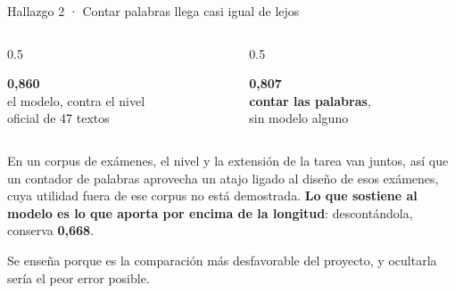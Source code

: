 \documentclass[aspectratio=169,11pt]{beamer}
\newcommand{\cifra}[2]{%
  \begin{minipage}{\linewidth}\centering
    {\fontsize{42}{46}\selectfont\bfseries\color{llazul}#1}\\[4pt]
    {\small\color{llgris}#2}
  \end{minipage}}
\begin{document}
\begin{frame}{Hallazgo 2 · Contar palabras llega casi igual de lejos}
\vspace{5mm}
\begin{columns}[T]
\begin{column}{0.5\textwidth}\centering
  \cifra{0,860}{el modelo, contra el nivel\\oficial de 47 textos}
\end{column}
\begin{column}{0.5\textwidth}\centering
  \cifra{0,807}{\textbf{contar las palabras},\\sin modelo alguno}
\end{column}
\end{columns}

\vspace{9mm}
{\small En un corpus de exámenes, el nivel y la extensión de la tarea van
juntos, así que un contador de palabras aprovecha un atajo ligado al diseño de
esos exámenes, cuya utilidad fuera de ese corpus no está demostrada. \textbf{Lo que sostiene al modelo es lo que aporta por
encima de la longitud}: descontándola, conserva \textbf{0,668}.}

\vspace{3mm}
{\footnotesize\color{llgris} Se enseña porque es la comparación más
desfavorable del proyecto, y ocultarla sería el peor error posible.}
\end{frame}
\end{document}

